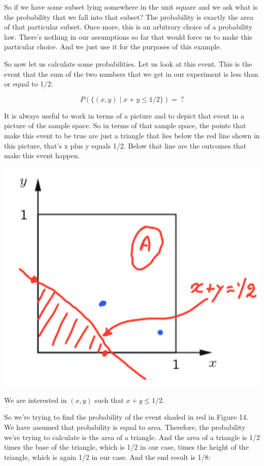\documentclass{tufte-handout}
\begin{document}
So if we have some subset lying somewhere in the unit square and we ask what is the probability that we fall into
that subset? The probability is exactly the area of that particular subset. Once more, this is an arbitrary
choice of a probability law. There's nothing in our assumptions so far that would force us to make this
particular choice. And we just use it for the purposes of this example.


So now let us calculate some probabilities. Let us look at this event. This is the event that the sum of
the two numbers that we get in our experiment is less than or equal to 1/2: 

$$
P\left(  \{(x, y) \mid x + y \leq 1/2   \}   \right) = \ ?
$$

It is always useful to work in
terms of a picture and to depict that event in a picture of the sample space. So in terms of that sample
space, the points that make this event to be true are just a triangle that lies below the red line shown in
this picture, that's x plus y equals 1/2. Below that line are the outcomes that make this
event happen.

\begin{marginfigure}
  \includegraphics{ContSampleSpace1}
  \caption{We are interested in $(x, y)$ such that $x + y \leq 1/2$.}
\end{marginfigure}

So we're trying to find the probability of the event shaded in red in Figure 14. We have assumed that probability is equal to
area. Therefore, the probability we're trying to calculate is the area of a triangle. And the area of a
triangle is 1/2 times the base of the triangle, which is 1/2 in our case, times the height of the triangle,
which is again 1/2 in our case. And the end result is 1/8:
\end{document}
